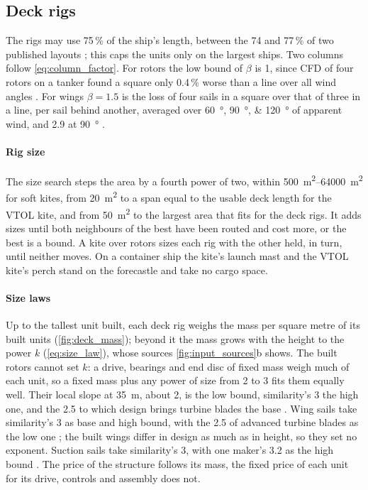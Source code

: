 \subsection{Deck rigs}
\label{sec:det_deck}

The rigs may use 75\,\% of the ship's length, between the 74 and 77\,\% of two published layouts \citep{han2025,mboumba2022}; this caps the units only on the largest ships. Two columns follow \cref{eq:column_factor}. For rotors the low bound of $\beta$ is 1, since CFD of four rotors on a tanker found a square only 0.4\,\% worse than a line over all wind angles \citep{guzelbulut2024arrangement}. For wings $\beta=1.5$ is the loss of four sails in a square over that of three in a line, per sail behind another, averaged over \SIlist{60;90;120}{\degree} of apparent wind, and 2.9 at \SI{90}{\degree} \citep{vanreen2026}.

\paragraph{Rig size} The size search steps the area by a fourth power of two, within \SIrange{500}{64000}{m^2} for soft kites, from \SI{20}{m^2} to a span equal to the usable deck length for the VTOL kite, and from \SI{50}{m^2} to the largest area that fits for the deck rigs. It adds sizes until both neighbours of the best have been routed and cost more, or the best is a bound. A kite over rotors sizes each rig with the other held, in turn, until neither moves. On a container ship the kite's launch mast and the VTOL kite's perch stand on the forecastle and take no cargo space.

\paragraph{Size laws}
\label{app:size_laws}
Up to the tallest unit built, each deck rig weighs the mass per square metre of its built units (\cref{fig:deck_mass}); beyond it the mass grows with the height to the power $k$ (\cref{eq:size_law}), whose sources \cref{fig:input_sources}b shows. The built rotors cannot set $k$: a drive, bearings and end disc of fixed mass weigh much of each unit, so a fixed mass plus any power of size from 2 to 3 fits them equally well. Their local slope at \SI{35}{m}, about 2, is the low bound, similarity's 3 the high one, and the 2.5 to which design brings turbine blades the base \citep{fingersh2006}. Wing sails take similarity's 3 as base and high bound, with the 2.5 of advanced turbine blades as the low one \citep{fingersh2006}; the built wings differ in design as much as in height, so they set no exponent. Suction sails take similarity's 3, with one maker's 3.2 as the high bound \citep{econowind2026vf3,econowind2026vf5}. The price of the structure follows its mass, the fixed price of each unit for its drive, controls and assembly does not.

